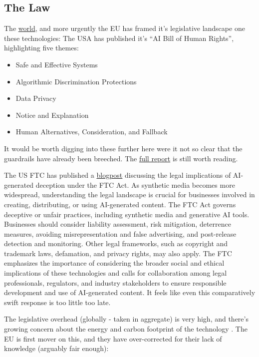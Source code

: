 \subsection{The Law}
The \href{https://www.holisticai.com/papers/the-state-of-ai-regulations-in-2023}{world}, and more urgently the EU has framed it's legislative landscape one these technologies:
The USA has published it's ``AI Bill of Human Rights'', highlighting five themes:
\begin{itemize}
\item Safe and Effective Systems
\item Algorithmic Discrimination Protections
\item Data Privacy
\item Notice and Explanation
\item Human Alternatives, Consideration, and Fallback
\end{itemize}
It would be worth digging into these further here were it not so clear that the guardrails have already been breeched. The \href{https://www.whitehouse.gov/wp-content/uploads/2022/10/Blueprint-for-an-AI-Bill-of-Rights.pdf}{full report} is still worth reading.\par 
The US FTC has published a \href{}{blogpost} discussing the legal implications of AI-generated deception under the FTC Act. As synthetic media becomes more widespread, understanding the legal landscape is crucial for businesses involved in creating, distributing, or using AI-generated content. The FTC Act governs deceptive or unfair practices, including synthetic media and generative AI tools. Businesses should consider liability assessment, risk mitigation, deterrence measures, avoiding misrepresentation and false advertising, and post-release detection and monitoring. Other legal frameworks, such as copyright and trademark laws, defamation, and privacy rights, may also apply. The FTC emphasizes the importance of considering the broader social and ethical implications of these technologies and calls for collaboration among legal professionals, regulators, and industry stakeholders to ensure responsible development and use of AI-generated content. It feels like even this comparatively swift response is too little too late. \par
The legislative overhead (globally - taken in aggregate) is very high, and there's growing concern about the energy and carbon footprint of the technology \cite{wu2022sustainable}. The EU is first mover on this, and they have over-corrected for their lack of knowledge (arguably fair enough):\par
